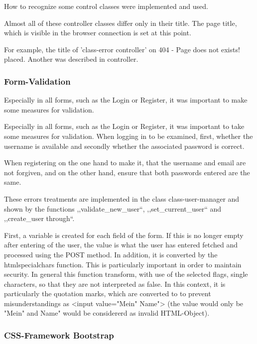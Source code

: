 \documentclass[a4paper,12pt,oneside]{article} %
\begin{document}
How to recognize some control classes were implemented and used. 

Almost all of these controller classes differ only in their title.
The page title, which is visible in the browser connection is \textquotedbl{}set\textquotedbl{}
at this point. 

For example, the title of 'class-error controller' on \textquotedbl{}404
- Page does not exists!\textquotedbl{} placed. Another was described
in controller.


\subsubsection{Form-Validation}

Especially in all forms, such as the Login or Register, it was important
to make some measures for validation.

Especially in all forms, such as the Login or Register, it was important
to take some measures for validation. When logging in to be examined,
first, whether the username is available and secondly whether the
associated password is correct.

When registering on the one hand to make it, that the username and
email are not forgiven, and on the other hand, ensure that both passwords
entered are the same.

These errors treatments are implemented in the class \textquotedbl{}class-user-manager\textquotedbl{}
and shown by the functions ,,validate\_new\_user``, ,,set\_current\_user``
and ,,create\_user through``.

First, a variable is created for each field of the form. If this is no longer empty after entering of the user, the value is what the user has entered fetched and processed using the POST method. In addition, it is converted by the htmlspecialchars function. This is particularly important in order to maintain security. In general this function transform, with use of the selected flags,  single characters, so that they are not interpreted as false. In this context, it is particularly the quotation marks, which are converted to  to prevent misunderstandings as <input value="Mein" Name"> (the value would only be "Mein" and Name" would be considererd as invalid HTML-Object).


\subsubsection{CSS-Framework Bootstrap}
\end{document}

